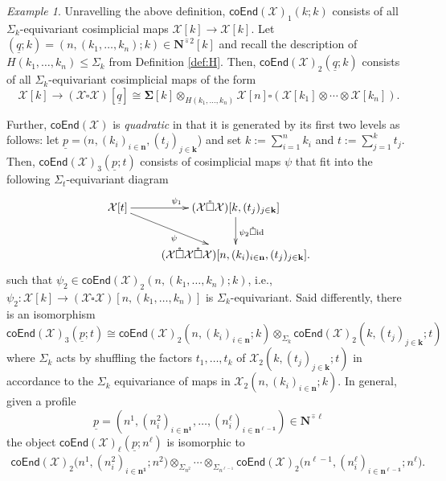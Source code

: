 \documentclass[11pt]{amsart}
\theoremstyle{definition}
\theoremstyle{remark}
\newtheorem{example}[subsection]{Example}
\newcommand{\Cal}[1]{\mathcal{#1}}
\newcommand{\Ncirc}[1]{\mathbf{N}^{\hat{\circ}#1}}
\newcommand{\boxcirc}{\mathring{\square}}
\begin{document}
\begin{example} Unravelling the above definition, $\mathsf{coEnd}(\Cal{X})_1(k;k)$ consists of all $\Sigma_k$-equivariant cosimplicial maps $\Cal{X}[k] \to \Cal{X}[k]$. Let $(\underline{q};k)=(n,(k_1,\dots,k_n);k)\in \Ncirc{2}[k]$ and recall the description of $H(k_1,\dots,k_n)\leq \Sigma_k$ from Definition \ref{def:H}. Then, $\mathsf{coEnd}(\Cal{X})_2(\underline{q};k)$ consists of all $\Sigma_k$-equivariant cosimplicial maps of the form \[ 
    \Cal{X}[k] \to (\Cal{X}\boxcirc \Cal{X}) [\underline{q}]\cong \mathbf{\Sigma}[k] \otimes_{H(k_1,\dots,k_n)} \Cal{X}[n] \square (\Cal{X}[k_1] \otimes\cdots \otimes \Cal{X}[k_n]).
\] 

Further, $\mathsf{coEnd}(\Cal{X})$ is \textit{quadratic} in that it is generated by its first two levels as follows: let $\underline{p}=(n, (k_i)_{i\in \mathbf{n}}, (t_j)_{j\in \mathbf{k}}$) and set $k:=\sum_{i=1}^n k_i$ and $t:=\sum_{j=1}^k t_j$. Then, $\mathsf{coEnd}(\Cal{X})_3(\underline{p};t)$ consists of cosimplicial maps $\psi$ that fit into the following $\Sigma_t$-equivariant diagram \begin{equation*}
\xymatrix{
    \Cal{X} [t] \ar[r]^{\psi_1} \ar[dr]_{\psi} & 
    (\Cal{X}\boxcirc\Cal{X})[k, (t_j)_{j\in\mathbf{k}}] \ar[d]^{\psi_2\boxcirc \textrm{id}} 
    \\ 
    & (\Cal{X}\boxcirc\Cal{X}\boxcirc \Cal{X}) [ n, (k_i)_{i\in\mathbf{n}}, (t_j)_{j\in\mathbf{k}}].
    }
\end{equation*}
such that $\psi_2\in \mathsf{coEnd}(\Cal{X})_2(n,(k_1,\dots,k_n);k)$, i.e., $\psi_2\colon \Cal{X}[k]\to (\Cal{X}\boxcirc \Cal{X})[n,(k_1,\dots,k_n)]$ is $\Sigma_k$-equivariant. Said differently, there is an isomorphism \[
    \mathsf{coEnd}(\mathcal{X})_3(\underline{p};t)\cong  \mathsf{coEnd}(\mathcal{X})_2(n, (k_i)_{i\in\mathbf{n}};k) \otimes_{\Sigma_k} \mathsf{coEnd}(\mathcal{X})_2(k, (t_j)_{j\in\mathbf{k}}; t)
\] where $\Sigma_k$ acts by shuffling the factors $t_1,\dots,t_k$ of $\Cal{X}_2(k, (t_j)_{j\in\mathbf{k}};t)$ in accordance to the $\Sigma_k$ equivariance of maps in $\Cal{X}_2(n, (k_i)_{i\in\mathbf{n}};k)$. In general, given a profile \[\underline{p}=(n^1,(n^2_i)_{i\in\mathbf{n^1}}, \dots, (n^{\ell}_i)_{i\in \mathbf{n^{\ell-1}}}) \in\Ncirc{\ell}\] the object $\mathsf{coEnd}(\mathcal{X})_{\ell} (\underline{p};n^{\ell})$ is isomorphic to  \begin{align} \label{eq:coEnd-quad}
     \mathsf{coEnd}(\mathcal{X})_2\big(n^1, (n^2_i)_{i\in \mathbf{n^1}};n^2\big) \otimes_{\Sigma_{n^2}}  \cdots   \otimes_{\Sigma_{n^{\ell-1}}} \mathsf{coEnd}(\mathcal{X})_2\big(n^{\ell-1}, (n^{\ell}_i)_{i\in\mathbf{n^{\ell-1}}};n^{\ell}\big).\end{align} \end{example}
\end{document}
